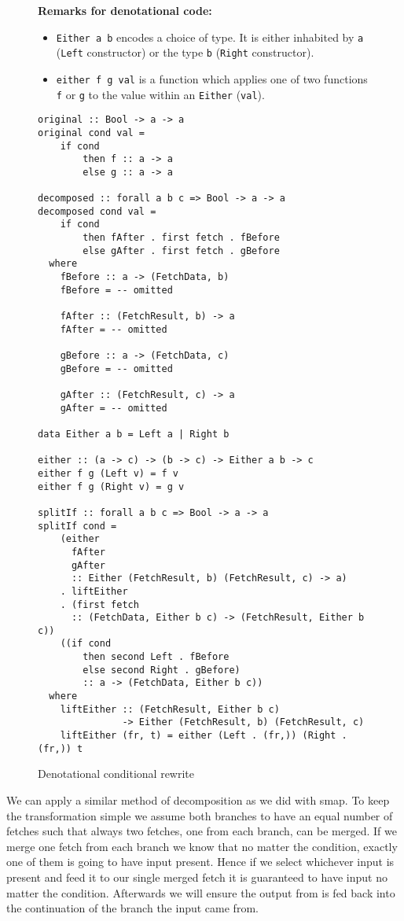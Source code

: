 \begin{figure}
\textbf{Remarks for denotational code:}
\begin{itemize}
  \item \texttt{Either a b} encodes a choice of type. It is either inhabited by \texttt{a} (\texttt{Left} constructor) or the type \texttt{b} (\texttt{Right} constructor).
  \item \texttt{either f g val} is a function which applies one of two functions \texttt{f} or \texttt{g} to the value within an \texttt{Either} (\texttt{val}).
\end{itemize}
\begin{verbatim}
original :: Bool -> a -> a
original cond val =
    if cond
        then f :: a -> a
        else g :: a -> a

decomposed :: forall a b c => Bool -> a -> a
decomposed cond val =
    if cond
        then fAfter . first fetch . fBefore
        else gAfter . first fetch . gBefore
  where
    fBefore :: a -> (FetchData, b)
    fBefore = -- omitted

    fAfter :: (FetchResult, b) -> a
    fAfter = -- omitted

    gBefore :: a -> (FetchData, c)
    gBefore = -- omitted

    gAfter :: (FetchResult, c) -> a
    gAfter = -- omitted

data Either a b = Left a | Right b

either :: (a -> c) -> (b -> c) -> Either a b -> c
either f g (Left v) = f v
either f g (Right v) = g v

splitIf :: forall a b c => Bool -> a -> a
splitIf cond =
    (either
      fAfter
      gAfter
      :: Either (FetchResult, b) (FetchResult, c) -> a)
    . liftEither
    . (first fetch
      :: (FetchData, Either b c) -> (FetchResult, Either b c))
    ((if cond
        then second Left . fBefore
        else second Right . gBefore)
        :: a -> (FetchData, Either b c))
  where
    liftEither :: (FetchResult, Either b c)
               -> Either (FetchResult, b) (FetchResult, c)
    liftEither (fr, t) = either (Left . (fr,)) (Right . (fr,)) t
\end{verbatim}
\caption{Denotational conditional rewrite}
\label{fig:if-rewrite-in-code}
\end{figure}

We can apply a similar method of decomposition as we did with smap.
To keep the transformation simple we assume both branches to have an equal number of fetches such that always two fetches, one from each branch, can be merged.
If we merge one fetch from each branch we know that no matter the condition, exactly one of them is going to have input present.
Hence if we select whichever input is present and feed it to our single merged fetch it is guaranteed to have input no matter the condition.
Afterwards we will ensure the output from \fetch{} is fed back into the continuation of the branch the input came from.

